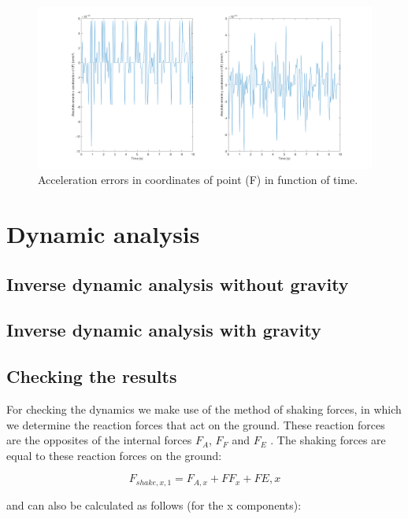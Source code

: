 \documentclass[a4paper]{article}
\begin{document}
\begin{figure}
	\centering
	
	\includegraphics[width = \textwidth]{contracc.png}
	
	\caption{Acceleration errors in coordinates of point (F) in function of time.}
	\label{fig:contracc}
	
\end{figure}

\section{Dynamic analysis}

\subsection{Inverse dynamic analysis without gravity}

\subsection{Inverse dynamic analysis with gravity}

\subsection{Checking the results}

For checking the dynamics we make use of the method of shaking forces, in which we determine the reaction forces that act on the ground. These reaction forces are the opposites of the internal forces \(F_A\), \(F_F\) and \(F_E\) . The shaking forces are equal to these reaction forces on the ground: 

\begin{equation}
	F_{shake,x,1} = F_{A,x} + F{F_x} + F{E,x}
\end{equation}

and can also be calculated as follows (for the x components):
\end{document}
